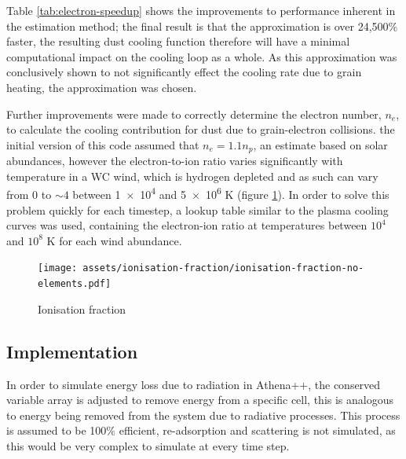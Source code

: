 Table \ref{tab:electron-speedup} shows the improvements to performance inherent in the estimation method; the final result is that the approximation is over 24,500\% faster, the resulting dust cooling function therefore will have a minimal computational impact on the cooling loop as a whole.
As this approximation was conclusively shown to not significantly effect the cooling rate due to grain heating, the approximation was chosen.

Further improvements were made to correctly determine the electron number, $n_e$, to calculate the cooling contribution for dust due to grain-electron collisions.
the initial version of this code assumed that $n_e = 1.1 n_p$, an estimate based on solar abundances, however the electron-to-ion ratio varies significantly with temperature in a WC wind, which is hydrogen depleted and as such can vary from 0 to $\sim 4$ between \num{1e4} and \num{5e6} \si{\kelvin} (figure \ref{fig:electron-curve-no-elements}).
In order to solve this problem quickly for each timestep, a lookup table similar to the plasma cooling curves was used, containing the electron-ion ratio at temperatures between $10^4$ and $10^8$ \si{\kelvin} for each wind abundance.

\begin{figure}
  \centering
  \texttt{[image: assets/ionisation-fraction/ionisation-fraction-no-elements.pdf]}
  \caption[Ionisation fraction for OB and WC stars]{Ionisation fraction}
  \label{fig:electron-curve-no-elements}
\end{figure}



\subsection{Implementation}
\label{sec:cooling-implementation}

In order to simulate energy loss due to radiation in Athena++, the conserved variable array is adjusted to remove energy from a specific cell, this is analogous to energy being removed from the system due to radiative processes.
This process is assumed to be 100\% efficient, re-adsorption and scattering is not simulated, as this would be very complex to simulate at every time step.


